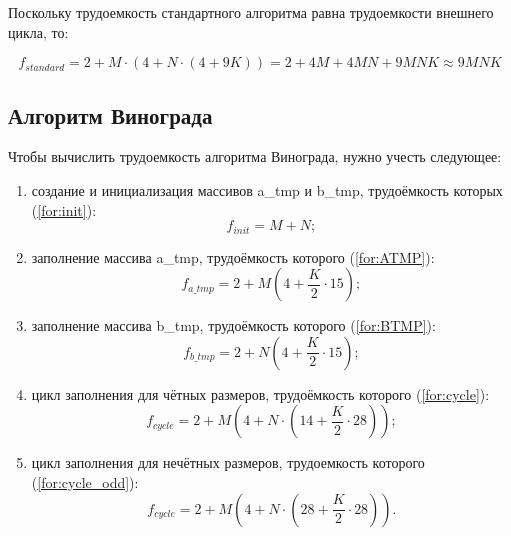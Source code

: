 Поскольку трудоемкость стандартного алгоритма равна трудоемкости внешнего цикла, то:

\begin{equation}
	\label{for:standard}
	f_{standard} = 2 + M \cdot (4 + N \cdot (4 + 9K)) = 2 + 4M + 4MN + 9MNK \approx 9MNK
\end{equation}


\subsection{Алгоритм Винограда}

Чтобы вычислить трудоемкость алгоритма Винограда, нужно учесть следующее: 

\begin{enumerate}[label=\arabic*)]
	\item создание и инициализация массивов a\_tmp и b\_tmp, трудоёмкость которых (\ref{for:init}):
	\begin{equation}
		\label{for:init}
		f_{init} = M + N;
	\end{equation}
	
	\item заполнение массива a\_tmp, трудоёмкость которого (\ref{for:ATMP}):
	\begin{equation}
		\label{for:ATMP}
		f_{a\_tmp} = 2 + M (4 + \frac{K}{2} \cdot 15);
	\end{equation}
	
	\item заполнение массива b\_tmp, трудоёмкость которого (\ref{for:BTMP}):
	\begin{equation}
		\label{for:BTMP}
		f_{b\_tmp} = 2 + N (4 + \frac{K}{2} \cdot 15);
	\end{equation}
	
	\item цикл заполнения для чётных размеров, трудоёмкость которого (\ref{for:cycle}):
	\begin{equation}
		\label{for:cycle}
		f_{cycle} = 2 + M (4 + N \cdot (14 + \frac{K}{2} \cdot 28));
	\end{equation}
	
	\item цикл заполнения для нечётных размеров, трудоемкость которого (\ref{for:cycle_odd}):
	\begin{equation}
		\label{for:cycle_odd}
		f_{cycle} = 2 + M (4 + N \cdot (28 + \frac{K}{2} \cdot 28)).
	\end{equation}
\end{enumerate}


